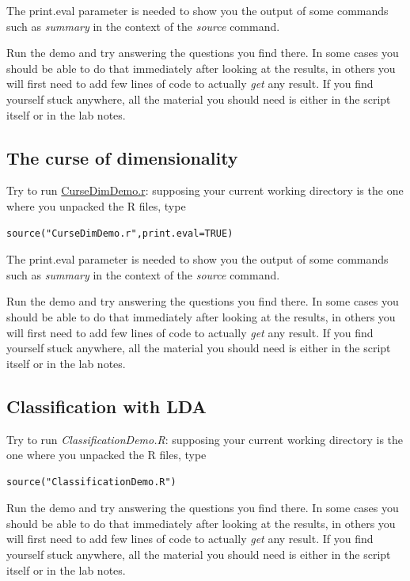 \documentclass[a4paper,12pt,titlepage]{article} %
\begin{document}
The print.eval parameter is needed to show you the output of some commands such as \textit{summary} in the context of the \textit{source} command.

Run the demo and try answering the questions you find there. In some cases you should be able to do that immediately after looking at the results, in others you will first need to add few lines of code to actually \textit{get} any result. If you find yourself stuck anywhere, all the material you should need is either in the script itself or in the lab notes.

\subsection{The curse of dimensionality}
Try to run \underline{CurseDimDemo.r}: supposing your current working directory is the one where you unpacked the R files, type
\begin{verbatim}
source("CurseDimDemo.r",print.eval=TRUE)
\end{verbatim}

The print.eval parameter is needed to show you the output of some commands such as \textit{summary} in the context of the \textit{source} command.

Run the demo and try answering the questions you find there. In some cases you should be able to do that immediately after looking at the results, in others you will first need to add few lines of code to actually \textit{get} any result. If you find yourself stuck anywhere, all the material you should need is either in the script itself or in the lab notes.

\subsection{Classification with LDA}
Try to run \textit{ClassificationDemo.R}: supposing your current working directory is the one where you unpacked the R files, type
\begin{verbatim}
source("ClassificationDemo.R")
\end{verbatim}

Run the demo and try answering the questions you find there. In some cases you should be able to do that immediately after looking at the results, in others you will first need to add few lines of code to actually \textit{get} any result. If you find yourself stuck anywhere, all the material you should need is either in the script itself or in the lab notes.
\end{document}
